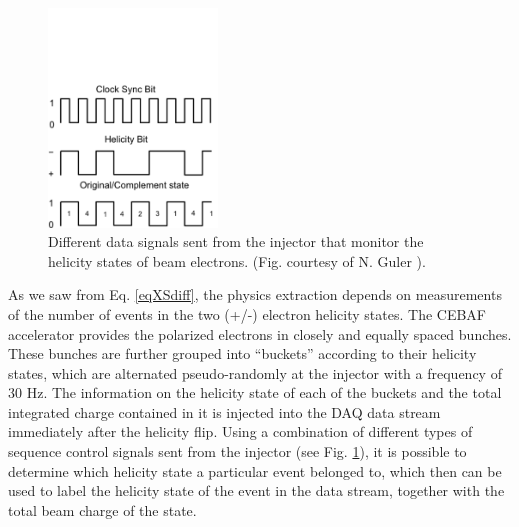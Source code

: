 \begin{figure}[H]%
  \centering
  \leavevmode \includegraphics[width=0.4\textwidth]{figuresEG4/FigSim/helicityPairingNevzatCut} 
  \caption[Helicity Pairing]{Different data signals sent from the injector that monitor the helicity states of beam electrons. (Fig. courtesy of N. Guler \cite{nGuler_th} ).}
  \label{figHeli}
\end{figure}

As we saw from Eq. \ref{eqXSdiff}, the physics %
extraction depends on %
measurements of the number of events in %
the two (+/-) electron helicity states. The CEBAF accelerator provides the polarized electrons in closely and %
equally spaced bunches. These bunches are further grouped into ``buckets'' according to their helicity states, which are %
alternated pseudo-randomly at the injector with a frequency of 30 Hz. The information on the helicity state of each of the buckets and the total integrated charge contained in it is injected into the DAQ data stream immediately after the helicity flip. Using a combination of different types of sequence control signals sent from the injector (see Fig. \ref{figHeli}), it is possible to determine which helicity state a particular event belonged to, which then can be used to label the helicity state of the event in the data stream, %
together with the total beam charge of the state.


